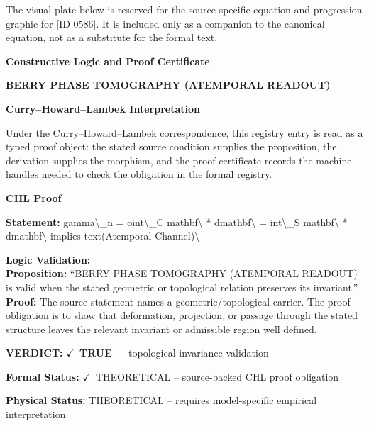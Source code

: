 \begingroup\footnotesize\sloppy
The visual plate below is reserved for the source-specific equation and progression graphic for [ID 0586]. It is included only as a companion to the canonical equation, not as a substitute for the formal text.
\par\endgroup
\ifTZPDarkEdition
{}
\fi

\clearpage
\begingroup\tzpsupportsetup
\noindent\textbf{\fontsize{10.8pt}{12.8pt}\selectfont [ID 0586] Constructive Logic and Proof Certificate}\par
\noindent\textbf{\fontsize{10pt}{12pt}\selectfont BERRY PHASE TOMOGRAPHY (ATEMPORAL READOUT)}\par
\vspace{0.45em}
\begingroup
\footnotesize
\setlength{\parskip}{0.22em}
\setlength{\parindent}{0pt}
\noindent\textbf{Curry--Howard--Lambek Interpretation}\par
Under the Curry--Howard--Lambek correspondence, this registry entry is read as a typed proof
object: the stated source condition supplies the proposition, the derivation supplies the
morphism, and the proof certificate records the machine handles needed to check the obligation
in the formal registry.

\vspace{0.45em}
\noindent\textbf{CHL Proof}\par
\textbf{Statement:} gamma\textbackslash{}\_n = oint\textbackslash{}\_C mathbf\textbackslash{} * dmathbf\textbackslash{} = int\textbackslash{}\_S mathbf\textbackslash{} * dmathbf\textbackslash{} implies text(Atemporal
Channel)\textbackslash{}

\textbf{Logic Validation:}\\
\textbf{Proposition:} ``BERRY PHASE TOMOGRAPHY (ATEMPORAL READOUT) is valid when the stated geometric or
topological relation preserves its invariant.''\\
\textbf{Proof:} The source statement names a geometric/topological carrier. The proof obligation is to
show that deformation, projection, or passage through the stated structure leaves the
relevant invariant or admissible region well defined.

\textbf{VERDICT:} \ensuremath{\checkmark}\ \textbf{TRUE} --- topological-invariance validation

\textbf{Formal Status:} \ensuremath{\checkmark}\ THEORETICAL -- source-backed CHL proof obligation

\textbf{Physical Status:} THEORETICAL -- requires model-specific empirical interpretation
\par\vspace{0.45em}
\par
\ifTZPDarkEdition
{}
\fi
\endgroup
\endgroup
